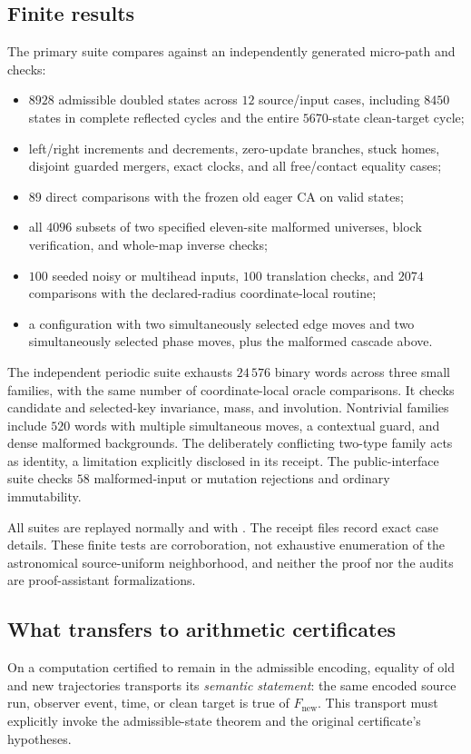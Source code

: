 \documentclass[11pt,a4paper]{article}
\numberwithin{equation}{section}
\newcommand{\Fnew}{F_{\mathrm{new}}}\newcommand{\Fold}{F_{\mathrm{old}}}
\newcommand{\file}[1]{\texttt{\detokenize{#1}}}
\begin{document}
\subsection{Finite results}
The primary suite compares against an independently generated micro-path and checks:
\begin{itemize}
\item $8928$ admissible doubled states across $12$ source/input cases, including $8450$ states in complete reflected cycles and the entire $5670$-state clean-target cycle;
\item left/right increments and decrements, zero-update branches, stuck homes, disjoint guarded mergers, exact clocks, and all free/contact equality cases;
\item $89$ direct comparisons with the frozen old eager CA on valid states;
\item all $4096$ subsets of two specified eleven-site malformed universes, block verification, and whole-map inverse checks;
\item $100$ seeded noisy or multihead inputs, $100$ translation checks, and $2074$ comparisons with the declared-radius coordinate-local routine;
\item a configuration with two simultaneously selected edge moves and two simultaneously selected phase moves, plus the malformed cascade above.
\end{itemize}
The independent periodic suite exhausts $24\,576$ binary words across three small families, with the same number of coordinate-local oracle comparisons. It checks candidate and selected-key invariance, mass, and involution. Nontrivial families include $520$ words with multiple simultaneous moves, a contextual guard, and dense malformed backgrounds. The deliberately conflicting two-type family acts as identity, a limitation explicitly disclosed in its receipt. The public-interface suite checks $58$ malformed-input or mutation rejections and ordinary immutability.

All suites are replayed normally and with \file{python -O}. The receipt files record exact case details. These finite tests are corroboration, not exhaustive enumeration of the astronomical source-uniform neighborhood, and neither the proof nor the audits are proof-assistant formalizations.

\subsection{What transfers to arithmetic certificates}
On a computation certified to remain in the admissible encoding, equality of old and new trajectories transports its \emph{semantic statement}: the same encoded source run, observer event, time, or clean target is true of $\Fnew$. This transport must explicitly invoke the admissible-state theorem and the original certificate's hypotheses.
\end{document}
